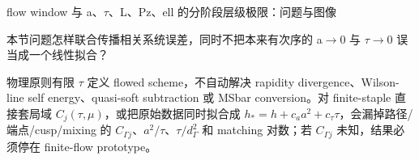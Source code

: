 \begin{frame}[t]{flow window 与 a、\ensuremath{\tau}、L、Pz、ell 的分阶段层级极限：问题与图像}
\footnotesize
\begin{block}{本节问题}怎样联合传播相关系统误差，同时不把本来有次序的 a\ensuremath{\rightarrow}0 与 \ensuremath{\tau}\ensuremath{\rightarrow}0 误当成一个线性拟合？\end{block}
\begin{block}{物理原则}\quad 有限 \ensuremath{\tau} 定义 flowed scheme，不自动解决 rapidity divergence、Wilson-line self energy、quasi-soft subtraction 或 MSbar conversion。对 finite-staple 直接套局域 \ensuremath{C_j(\tau,\mu)}，或把原始数据同时拟合成 \ensuremath{h_*=h+c_a a^2+c_\tau\tau}，会漏掉路径/\allowbreak{}端点/\allowbreak{}cusp/\allowbreak{}mixing 的 \ensuremath{C_{\Gamma j}}、\ensuremath{a^2/\tau}、\ensuremath{\tau/d_\Gamma^2} 和 matching 对数；若 \ensuremath{C_{\Gamma j}} 未知，结果必须停在 finite-flow prototype。\end{block}
\end{frame}

